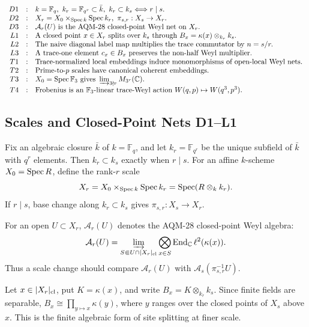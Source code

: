 \[
\begin{array}{rcl}
D1&:&k=\mathbb F_q,\ k_r=\mathbb F_{q^r}\subset\bar k,\
      k_r\subset k_s\Longleftrightarrow r\mid s.\\
D2&:&X_r=X_0\times_{\operatorname{Spec} k}\operatorname{Spec} k_r,\
      \pi_{s,r}:X_s\to X_r.\\
D3&:&\mathcal A_r(U)\text{ is the AQM-28 closed-point Weyl net on }X_r.\\
L1&:&\text{A closed point }x\in X_r\text{ splits over }k_s\text{ through }
      B_x=\kappa(x)\otimes_{k_r}k_s.\\
L2&:&\text{The naive diagonal label map multiplies the trace commutator by }
      n=s/r.\\
L3&:&\text{A trace-one element }c_x\in B_x\text{ preserves the non-half Weyl
      multiplier.}\\
T1&:&\text{Trace-normalized local embeddings induce monomorphisms of
      open-local Weyl nets.}\\
T2&:&\text{Prime-to-}p\text{ scales have canonical coherent embeddings.}\\
T3&:&X_0=\operatorname{Spec}\mathbb F_3\text{ gives }
      \varinjlim_{3\nmid r}M_{3^r}(\mathbb C).\\
T4&:&\text{Frobenius is an }\mathbb F_3\text{-linear trace-Weyl action }
      W(q,p)\mapsto W(q^3,p^3).
\end{array}
\]

\subsection{Scales and Closed-Point Nets D1--L1}

Fix an algebraic closure \(\bar k\) of \(k=\mathbb F_q\), and let
\(k_r=\mathbb F_{q^r}\) be the unique subfield of \(\bar k\) with \(q^r\)
elements.  Then \(k_r\subset k_s\) exactly when \(r\mid s\).  For an affine
\(k\)-scheme \(X_0=\operatorname{Spec} R\), define the rank-\(r\) scale
\[
  X_r=X_0\times_{\operatorname{Spec} k}\operatorname{Spec} k_r=\operatorname{Spec}(R\otimes_k k_r).
\]
If \(r\mid s\), base change along \(k_r\subset k_s\) gives
\(\pi_{s,r}:X_s\to X_r\).

For an open \(U\subset X_r\), \(\mathcal A_r(U)\) denotes the AQM-28
closed-point Weyl algebra:
\[
  \mathcal A_r(U)=
  \varinjlim_{S\Subset U\cap |X_r|_{\rm cl}}
  \bigotimes_{x\in S}\operatorname{End}_{\mathbb C}\ell^2(\kappa(x)).
\]
Thus a scale change should compare \(\mathcal A_r(U)\) with
\(\mathcal A_s(\pi_{s,r}^{-1}U)\).

Let \(x\in |X_r|_{\rm cl}\), put \(K=\kappa(x)\), and write
\(B_x=K\otimes_{k_r}k_s\).
Since finite fields are separable,
\(B_x\cong\prod_{y\mapsto x}\kappa(y)\), where \(y\) ranges over the closed
points of \(X_s\) above \(x\).  This is the
finite algebraic form of site splitting at finer scale.

